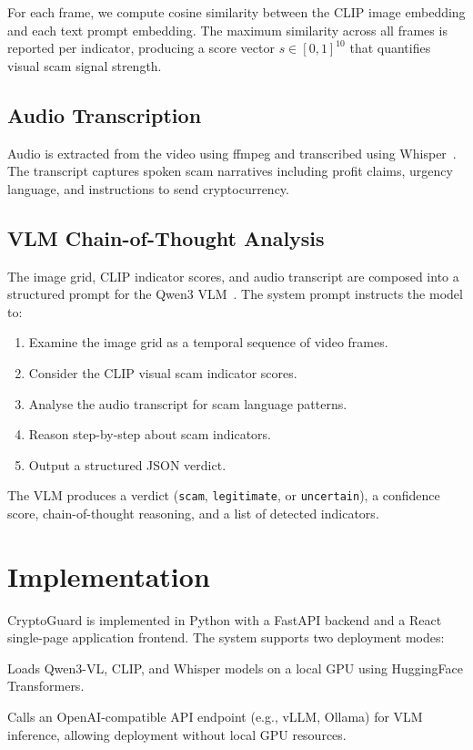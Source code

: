 \documentclass[12pt,a4paper]{article}
\begin{document}
For each frame, we compute cosine similarity between the CLIP image
embedding and each text prompt embedding. The maximum similarity across
all frames is reported per indicator, producing a score vector
$s \in [0, 1]^{10}$ that quantifies visual scam signal strength.

\subsection{Audio Transcription}

Audio is extracted from the video using ffmpeg and transcribed using
Whisper~\cite{radford2023whisper}. The transcript captures spoken
scam narratives including profit claims, urgency language, and
instructions to send cryptocurrency.

\subsection{VLM Chain-of-Thought Analysis}

The image grid, CLIP indicator scores, and audio transcript are
composed into a structured prompt for the Qwen3 VLM~\cite{qwen2024}.
The system prompt instructs the model to:
\begin{enumerate}[nosep]
  \item Examine the image grid as a temporal sequence of video frames.
  \item Consider the CLIP visual scam indicator scores.
  \item Analyse the audio transcript for scam language patterns.
  \item Reason step-by-step about scam indicators.
  \item Output a structured JSON verdict.
\end{enumerate}

The VLM produces a verdict (\texttt{scam}, \texttt{legitimate}, or
\texttt{uncertain}), a confidence score, chain-of-thought reasoning,
and a list of detected indicators.

\section{Implementation}

CryptoGuard is implemented in Python with a FastAPI backend and a
React single-page application frontend. The system supports two
deployment modes:

\begin{description}[nosep]
  \item[Local mode:] Loads Qwen3-VL, CLIP, and Whisper models on a
    local GPU using HuggingFace Transformers.
  \item[API mode:] Calls an OpenAI-compatible API endpoint (e.g., vLLM,
    Ollama) for VLM inference, allowing deployment without local GPU
    resources.
\end{description}
\end{document}
